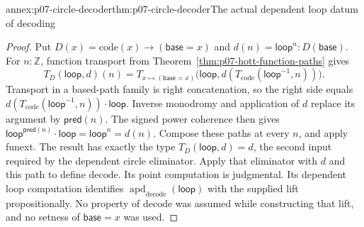 \begin{annexitem}{annex:p07-circle-decoder}{thm:p07-circle-decoder}{The actual dependent loop datum of decoding}
\begin{proof}
Put \(D(x)=\mathrm{code}(x)\to(\mathsf{base}=x)\) and
\(d(n)=\mathsf{loop}^n:D(\mathsf{base})\).
For \(n:\mathbb Z\), function transport from
Theorem~\ref{thm:p07-hott-function-paths} gives
\[
T_D(\mathsf{loop},d)(n)
 =T_{x\mapsto(\mathsf{base}=x)}
   \bigl(\mathsf{loop},
          d(T_{\mathrm{code}}(\mathsf{loop}^{-1},n))\bigr).
\]
Transport in a based-path family is right concatenation, so the right
side equals
\(d(T_{\mathrm{code}}(\mathsf{loop}^{-1},n))\cdot\mathsf{loop}\).
Inverse monodromy and application of \(d\) replace its argument by
\(\mathsf{pred}(n)\). The signed power coherence then gives
\(\mathsf{loop}^{\mathsf{pred}(n)}\cdot\mathsf{loop}
 =\mathsf{loop}^n=d(n)\).
Compose these paths at every \(n\), and apply funext. The result has
exactly the type \(T_D(\mathsf{loop},d)=d\), the second input required
by the dependent circle eliminator.
Apply that eliminator with \(d\) and this path to define \(\mathrm{decode}\).
Its point computation is judgmental. Its dependent loop computation
identifies \(\operatorname{apd}_{\mathrm{decode}}(\mathsf{loop})\)
with the supplied lift propositionally. No property of \(\mathrm{decode}\)
was assumed while constructing that lift, and no setness of
\(\mathsf{base}=x\) was used.
\end{proof}
\end{annexitem}

